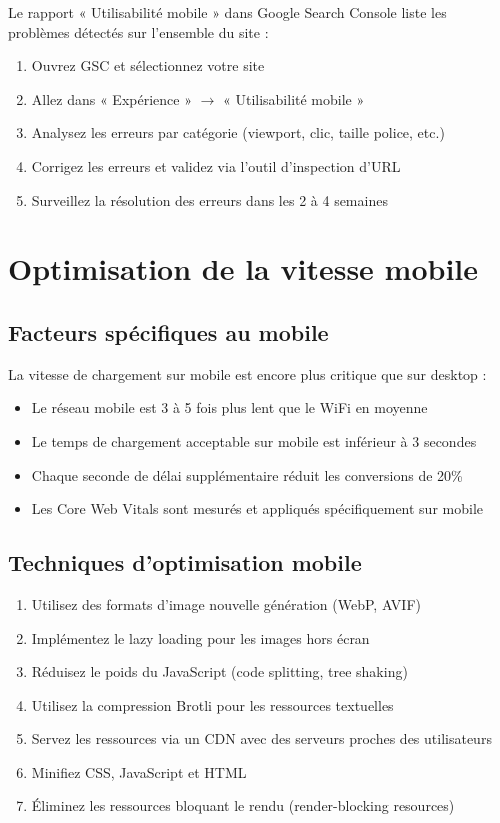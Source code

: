 \documentclass[12pt,a4paper,twoside]{report}
\begin{document}
Le rapport « Utilisabilité mobile » dans Google Search Console liste les problèmes détectés sur l'ensemble du site :

\begin{enumerate}
    \item Ouvrez GSC et sélectionnez votre site
    \item Allez dans « Expérience » $\rightarrow$ « Utilisabilité mobile »
    \item Analysez les erreurs par catégorie (viewport, clic, taille police, etc.)
    \item Corrigez les erreurs et validez via l'outil d'inspection d'URL
    \item Surveillez la résolution des erreurs dans les 2 à 4 semaines
\end{enumerate}

\section{Optimisation de la vitesse mobile}

\subsection{Facteurs spécifiques au mobile}

La vitesse de chargement sur mobile est encore plus critique que sur desktop :

\begin{itemize}
    \item Le réseau mobile est 3 à 5 fois plus lent que le WiFi en moyenne
    \item Le temps de chargement acceptable sur mobile est inférieur à 3 secondes
    \item Chaque seconde de délai supplémentaire réduit les conversions de 20\%
    \item Les Core Web Vitals sont mesurés et appliqués spécifiquement sur mobile
\end{itemize}

\subsection{Techniques d'optimisation mobile}

\begin{enumerate}
    \item Utilisez des formats d'image nouvelle génération (WebP, AVIF)
    \item Implémentez le lazy loading pour les images hors écran
    \item Réduisez le poids du JavaScript (code splitting, tree shaking)
    \item Utilisez la compression Brotli pour les ressources textuelles
    \item Servez les ressources via un CDN avec des serveurs proches des utilisateurs
    \item Minifiez CSS, JavaScript et HTML
    \item Éliminez les ressources bloquant le rendu (render-blocking resources)
\end{enumerate}
\end{document}
